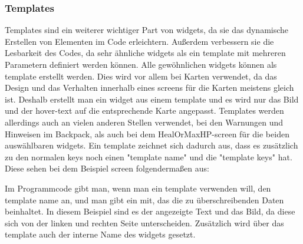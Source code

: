 \subsubsection{Templates}\label{sec:templates}
\renewcommand{\kapitelautor}{Autor: Felix Zwickelstorfer}
Templates sind ein weiterer wichtiger Part von widgets, da sie das dynamische Erstellen von Elementen im Code erleichtern.
Außerdem verbessern sie die Lesbarkeit des Codes, da sehr ähnliche widgets als ein template mit mehreren Parametern definiert werden können.
Alle gewöhnlichen widgets können als template erstellt werden.
Dies wird vor allem bei Karten verwendet, da das Design und das Verhalten innerhalb eines screens für die Karten meistens gleich ist.
Deshalb erstellt man ein widget aus einem template und es wird nur das Bild und der hover-text auf die entsprechende Karte angepasst.
Templates werden allerdings auch an vielen anderen Stellen verwendet, \zB bei den Warnungen und Hinweisen im Backpack, als auch bei dem HealOrMaxHP-screen für die beiden auswählbaren widgets.
Ein template zeichnet sich dadurch aus, dass es zusätzlich zu den normalen keys noch einen "template name" und die "template keys" hat.
Diese sehen bei dem Beispiel screen folgendermaßen aus:
Im Programmcode gibt man, wenn man ein template verwenden will, den template name an, und man gibt ein  mit, das die zu überschreibenden Daten beinhaltet.
In diesem Beispiel sind es der angezeigte Text und das Bild, da diese sich von der linken und rechten Seite unterscheiden.
Zusätzlich wird über das template auch der interne Name des widgets gesetzt.